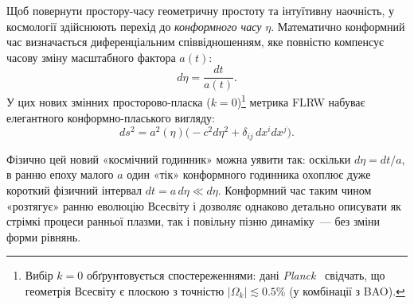 Щоб повернути простору-часу геометричну простоту та інтуїтивну наочність, у космології здійснюють перехід до \emph{конформного часу} $\eta$. Математично конформний час визначається диференціальним співвідношенням, яке повністю компенсує часову зміну масштабного фактора $a(t)$:
\begin{equation}\label{eq:conformal_time_def}
  d\eta = \frac{dt}{a(t)}.
\end{equation}
У цих нових змінних просторово-пласка ($k=0$)\footnote{Вибір $k=0$ обґрунтовується спостереженнями: дані
\emph{Planck}~\cite{planck_2018} свідчать, що геометрія Всесвіту
є плоскою з точністю $|\Omega_k| \lesssim 0.5\%$ (у комбінації з BAO).} метрика FLRW набуває елегантного конформно-пласького вигляду:
\begin{equation}\label{eq:conformal_metric}
  ds^2 = a^2(\eta)\bigl(-c^2 d\eta^2 + \delta_{ij}\,dx^i dx^j\bigr).
\end{equation}

Фізично цей новий «космічний годинник» можна уявити так: оскільки $d\eta = dt/a$, в ранню епоху малого $a$ один «тік» конформного годинника охоплює дуже короткий фізичний інтервал $dt = a\,d\eta \ll d\eta$. Конформний час таким чином «розтягує» ранню еволюцію Всесвіту і дозволяє однаково детально описувати як стрімкі процеси ранньої плазми, так і повільну пізню динаміку~--- без зміни форми рівнянь.

